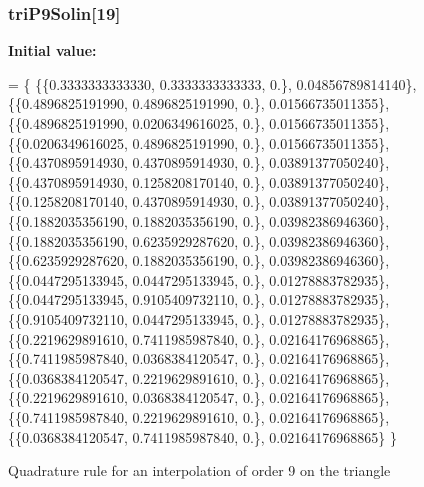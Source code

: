 \subsubsection[{tri\-P9\-Solin}]{ tri\-P9\-Solin[19]}\label{GaussQuadratureTri_8cc_ac61a9c4db54f321e271eb5fa3dee6e61}
{\bfseries Initial value\-:}
\begin{DoxyCode}
= \{
  \{\{0.3333333333330, 0.3333333333333, 0.\}, 0.04856789814140\},
  \{\{0.4896825191990, 0.4896825191990, 0.\}, 0.01566735011355\},
  \{\{0.4896825191990, 0.0206349616025, 0.\}, 0.01566735011355\},
  \{\{0.0206349616025, 0.4896825191990, 0.\}, 0.01566735011355\},
  \{\{0.4370895914930, 0.4370895914930, 0.\}, 0.03891377050240\},
  \{\{0.4370895914930, 0.1258208170140, 0.\}, 0.03891377050240\},
  \{\{0.1258208170140, 0.4370895914930, 0.\}, 0.03891377050240\},
  \{\{0.1882035356190, 0.1882035356190, 0.\}, 0.03982386946360\},
  \{\{0.1882035356190, 0.6235929287620, 0.\}, 0.03982386946360\},
  \{\{0.6235929287620, 0.1882035356190, 0.\}, 0.03982386946360\},
  \{\{0.0447295133945, 0.0447295133945, 0.\}, 0.01278883782935\},
  \{\{0.0447295133945, 0.9105409732110, 0.\}, 0.01278883782935\},
  \{\{0.9105409732110, 0.0447295133945, 0.\}, 0.01278883782935\},
  \{\{0.2219629891610, 0.7411985987840, 0.\}, 0.02164176968865\},
  \{\{0.7411985987840, 0.0368384120547, 0.\}, 0.02164176968865\},
  \{\{0.0368384120547, 0.2219629891610, 0.\}, 0.02164176968865\},
  \{\{0.2219629891610, 0.0368384120547, 0.\}, 0.02164176968865\},
  \{\{0.7411985987840, 0.2219629891610, 0.\}, 0.02164176968865\},
  \{\{0.0368384120547, 0.7411985987840, 0.\}, 0.02164176968865\}
\}
\end{DoxyCode}
Quadrature rule for an interpolation of order 9 on the triangle 
